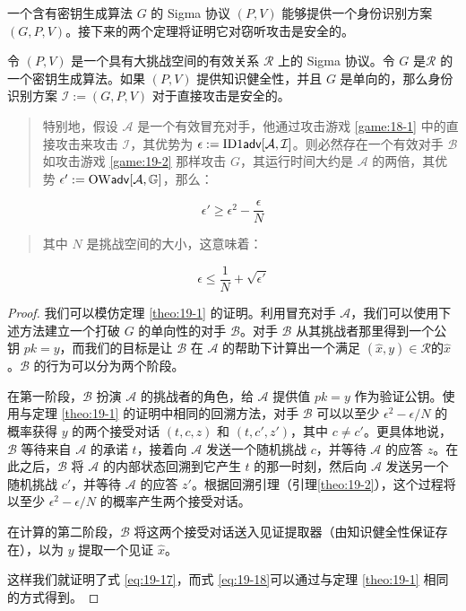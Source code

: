 一个含有密钥生成算法 $G$ 的 Sigma 协议 $(P,V)$ 能够提供一个身份识别方案 $(G,P,V)$。接下来的两个定理将证明它对窃听攻击是安全的。

\begin{theorem}
令 $(P,V)$ 是一个具有大挑战空间的有效关系 $\mathcal{R}$ 上的 Sigma 协议。令 $G$ 是$\mathcal{R}$ 的一个密钥生成算法。如果 $(P,V)$ 提供知识健全性，并且 $G$ 是单向的，那么身份识别方案 $\mathcal{I}:=(G,P,V)$ 对于直接攻击是安全的。

\begin{quote}
特别地，假设 $\mathcal{A}$ 是一个有效冒充对手，他通过攻击游戏 \ref{game:18-1} 中的直接攻击来攻击 $\mathcal{I}$，其优势为 $\epsilon:=\rm{ID1\mathsf{adv}}[\mathcal{A},\mathcal{I}]$。则必然存在一个有效对手 $\mathcal{B}$如攻击游戏 \ref{game:19-2} 那样攻击 $G$，其运行时间大约是 $\mathcal{A}$ 的两倍，其优势 $\epsilon':={\rm OW\mathsf{adv}}[\mathcal{A},\mathbb{G}]$，那么：
\end{quote}
\begin{equation}\label{eq:19-17}
\epsilon'\geq \epsilon^2-\frac{\epsilon}{N}
\end{equation}
\begin{quote}
其中 $N$ 是挑战空间的大小，这意味着：
\end{quote}
\begin{equation}\label{eq:19-18}
\epsilon\leq\frac{1}{N}+\sqrt{\epsilon'}
\end{equation}
\end{theorem}

\begin{proof}
我们可以模仿定理 \ref{theo:19-1} 的证明。利用冒充对手 $\mathcal{A}$，我们可以使用下述方法建立一个打破 $G$ 的单向性的对手 $\mathcal{B}$。对手 $\mathcal{B}$ 从其挑战者那里得到一个公钥 $pk = y$，而我们的目标是让 $\mathcal{B}$ 在 $\mathcal{A}$ 的帮助下计算出一个满足 $(\hat x,y)\in\mathcal{R}$的$\hat x$。$\mathcal{B}$ 的行为可以分为两个阶段。

在第一阶段，$\mathcal{B}$ 扮演 $\mathcal{A}$ 的挑战者的角色，给 $\mathcal{A}$ 提供值 $pk=y$ 作为验证公钥。使用与定理 \ref{theo:19-1} 的证明中相同的回溯方法，对手 $\mathcal{B}$ 可以以至少 $\epsilon^2-{\epsilon}/{N}$ 的概率获得 $y$ 的两个接受对话 $(t,c,z)$ 和 $(t,c',z')$，其中 $c\neq c'$。更具体地说，$\mathcal{B}$ 等待来自 $\mathcal{A}$ 的承诺 $t$，接着向 $\mathcal{A}$ 发送一个随机挑战 $c$，并等待 $\mathcal{A}$ 的应答 $z$。在此之后，$\mathcal{B}$ 将 $\mathcal{A}$ 的内部状态回溯到它产生 $t$ 的那一时刻，然后向 $\mathcal{A}$ 发送另一个随机挑战 $c'$，并等待 $\mathcal{A}$ 的应答 $z'$。根据回溯引理（引理\ref{theo:19-2}），这个过程将以至少 $\epsilon^2-{\epsilon}/{N}$ 的概率产生两个接受对话。

在计算的第二阶段，$\mathcal{B}$ 将这两个接受对话送入见证提取器（由知识健全性保证存在），以为 $y$ 提取一个见证 $\hat x$。

这样我们就证明了式 \ref{eq:19-17}，而式 \ref{eq:19-18}可以通过与定理 \ref{theo:19-1} 相同的方式得到。
\end{proof}

